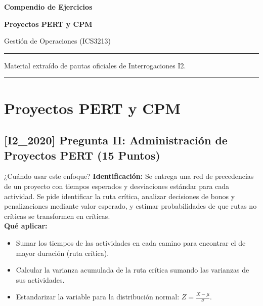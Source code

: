 \documentclass[11pt, a4paper]{article}
\begin{document}
\begin{titlepage}
  \centering
  \vspace*{2cm}
  {\Huge\bfseries\color{gopcyan} Compendio de Ejercicios\par}
  \vspace{0.4cm}
  {\LARGE\bfseries Proyectos PERT y CPM\par}
  \vspace{0.3cm}
  {\large Gestión de Operaciones (ICS3213)\par}
  \vspace{1.2cm}
  \rule{\textwidth}{0.4pt}
  \vspace{0.4cm}
  {\small Material extraído de pautas oficiales de Interrogaciones I2.\par}
  \vspace{0.4cm}
  \rule{\textwidth}{0.4pt}
  \vfill
\end{titlepage}

\newpage
\section*{Proyectos PERT y CPM}

\subsection*{[I2_2020] Pregunta II: Administración de Proyectos PERT (15 Puntos)}
\begin{tipprueba}{¿Cuándo usar este enfoque?}
    \textbf{Identificación:} Se entrega una red de precedencias de un proyecto con tiempos esperados y desviaciones estándar para cada actividad. Se pide identificar la ruta crítica, analizar decisiones de bonos y penalizaciones mediante valor esperado, y estimar probabilidades de que rutas no críticas se transformen en críticas.\\
    \textbf{Qué aplicar:} 
    \begin{itemize}
      \item Sumar los tiempos de las actividades en cada camino para encontrar el de mayor duración (ruta crítica).
      \item Calcular la varianza acumulada de la ruta crítica sumando las varianzas de sus actividades.
      \item Estandarizar la variable para la distribución normal: $Z = \frac{X - \mu}{\sigma}$.
    \end{itemize}
  \end{tipprueba}
\end{document}
